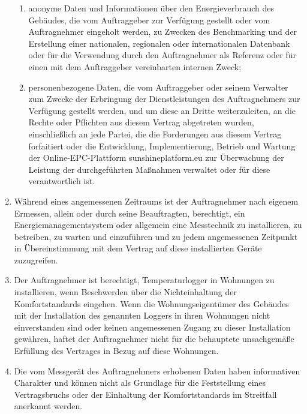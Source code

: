 \begin{multicols}{2}
\begin{enumerate}
   \begin{enumerate}
   \item anonyme Daten und Informationen über den Energieverbrauch des Gebäudes, die vom Auftraggeber zur Verfügung gestellt oder vom Auftragnehmer eingeholt werden, zu Zwecken des Benchmarking und der Erstellung einer nationalen, regionalen oder internationalen Datenbank oder für die Verwendung durch den Auftragnehmer als Referenz oder für einen mit dem Auftraggeber vereinbarten internen Zweck;
   \item personenbezogene Daten, die vom Auftraggeber oder seinem Verwalter zum Zwecke der Erbringung der Dienstleistungen des Auftragnehmers zur Verfügung gestellt werden, und um diese an Dritte weiterzuleiten, an die  Rechte oder Pflichten aus diesem Vertrag abgetreten wurden, einschließlich an jede Partei, die die Forderungen aus diesem Vertrag forfaitiert oder die Entwicklung, Implementierung, Betrieb und Wartung der Online-EPC-Plattform sunshineplatform.eu zur Überwachung der Leistung der durchgeführten Maßnahmen verwaltet oder für diese verantwortlich ist.
   \end{enumerate}
   \item Während eines angemessenen Zeitraums ist der Auftragnehmer nach eigenem Ermessen, allein oder durch seine Beauftragten, berechtigt, ein Energiemanagementsystem oder allgemein eine Messtechnik zu installieren, zu betreiben, zu warten und einzuführen und zu jedem angemessenen Zeitpunkt in Übereinstimmung mit dem Vertrag auf diese installierten Geräte zuzugreifen.
   \item Der Auftragnehmer ist berechtigt, Temperaturlogger in Wohnungen zu installieren, wenn Beschwerden über die Nichteinhaltung der Komfortstandards eingehen. Wenn die Wohnungseigentümer des Gebäudes mit der Installation des genannten Loggers in ihren Wohnungen nicht einverstanden sind oder keinen angemessenen Zugang zu dieser Installation gewähren, haftet der Auftragnehmer nicht für die behauptete unsachgemäße Erfüllung des Vertrages in Bezug auf diese Wohnungen.
   \item Die vom Messgerät des Auftragnehmers erhobenen Daten haben informativen Charakter und können nicht als Grundlage für die Feststellung eines Vertragsbruchs oder der Einhaltung der Komfortstandards im Streitfall anerkannt werden.
   \end{enumerate}


\end{multicols}
